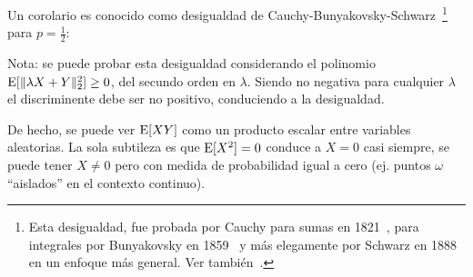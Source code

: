 {Un       corolario       es       conocido       como       desigualdad       de
Cauchy-Bunyakovsky-Schwarz~\footnote{Esta  desigualdad, fue  probada  por Cauchy
  para  sumas   en  1821~\cite{Cau21},   para  integrales  por   Bunyakovsky  en
  1859~\cite{Bou59} y  m\'as elegamente por  Schwarz en 1888~\cite{Sch88}  en un
  enfoque m\'as general. Ver tambi\'en~\cite{Ste04}.} para $p = \frac12$:
%
\begin{corolario}
\end{corolario}
%
Nota:  se puede  probar esta  desigualdad  considerando el  polinomio $\operatorname{E}[  \|
\lambda X + Y \|_2^2] \ge 0$, del secundo orden en $\lambda$. Siendo no negativa
para cualquier $\lambda$ el discriminente debe ser no positivo, conduciendo a la
desigualdad.

De hecho,  se puede  ver $\operatorname{E}[X  Y]$ como un  producto escalar  entre variables
aleatorias. La  sola subtileza es  que $\operatorname{E}[X^2]  = 0$ conduce  a $X =  0$ casi
siempre, \ie se  puede tener $X \ne  0$ pero con medida de  probabilidad igual a
cero (ej. puntos $\omega$ ``aislados'' en el contexto continuo).

}
